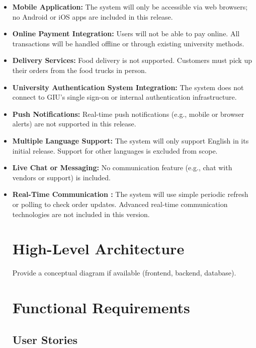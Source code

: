 \documentclass[12pt,a4paper]{article}
\begin{document}
\begin{itemize}[leftmargin=2em, itemsep=6pt]
    \item \textbf{Mobile Application:} The system will only be accessible via web browsers; no Android or iOS apps are included in this release.
    \item \textbf{Online Payment Integration:} Users will not be able to pay online. All transactions will be handled offline or through existing university methods.
    \item \textbf{Delivery Services:} Food delivery is not supported. Customers must pick up their orders from the food trucks in person.
    \item \textbf{University Authentication System Integration:} The system does not connect to GIU's single sign-on or internal authentication infrastructure.
    \item \textbf{Push Notifications:} Real-time push notifications (e.g., mobile or browser alerts) are not supported in this release.
\item \textbf{Multiple Language Support:} The system will only support English in its initial release. Support for other languages is excluded from scope.
    \item \textbf{Live Chat or Messaging:} No communication feature (e.g., chat with vendors or support) is included.
 \item \textbf{Real-Time Communication :} The system will use simple periodic refresh or polling to check order updates. Advanced real-time communication technologies are not included in this version.

\newpage

\section{High-Level Architecture}
Provide a conceptual diagram if available (frontend, backend, database).  

\newpage

\section{Functional Requirements}

\subsection{User Stories}


\end{itemize}
\end{document}
